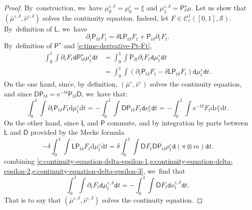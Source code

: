 \documentclass[JEP,XML,SOM,Unicode,published]{cedram}
\theoremstyle{definition}
\theoremstyle{remark}
\begin{document}
\begin{proof}
By~construction, we~have $\mu^{\varepsilon,\delta}_{0} = \mu^{\varepsilon}_{0} = \xi$ and $\mu^{\varepsilon,\delta}_{1} = \mathsf{P}^{\star}_{\delta} \mu$.
Let us show that $(\bar{\mu}^{\varepsilon,\delta}, \bar{\nu}^{\varepsilon,\delta})$ solves the continuity equation.
Indeed, let $F \in \mathscr{C}_{c}^{1}([0,1], \mathscr{S})$.
By~definition of $\mathsf{L}$, we~have
\begin{equation}\label{e:time-derivative-Pt-Ft}
\partial_{t} \mathsf{P}_{t \delta} F_{t} = \delta \mathsf{L} \mathsf{P}_{t \delta} F_{t} + \mathsf{P}_{t \delta} \partial_{t} F_{t}.
\end{equation}
By~definition of $\mathsf{P}^{\star}$ and \cref{e:time-derivative-Pt-Ft},
\begin{equation}\label{e:continuity-equation-delta-epsilon-1}
\begin{split}
\int_{0}^{1} \int \partial_{t} F_{t} \mathtt{d} \mathsf{P}^{\star}_{t\delta} \mu^{\varepsilon}_{t} \mathtt{d} t &= \int_{0}^{1} \int \mathsf{P}_{\delta t} \partial_{t} F_{t} \mathtt{d} \mu_{t}^{\varepsilon} \mathtt{d} t
\\&= \int_{0}^{1} \int (\partial_{t} \mathsf{P}_{t\delta}F_{t} - \delta \mathsf{L} \mathsf{P}_{t\delta}F_{t}) \mathtt{d} \mu^{\varepsilon}_{t} \mathtt{d} t.
\end{split}
\end{equation}
On the one hand, since, by definition, $(\bar{\mu}^{\varepsilon}, \bar{\nu}^{\varepsilon})$ solves the continuity equation, and since $\mathsf{D} \mathsf{P}_{t \delta} = \mathrm{e}^{-t \delta} \mathsf{P}_{t \delta} \mathsf{D}$, we~have that:
\begin{equation}\label{e:continuity-equation-delta-epsilon-2}
\int_{0}^{1} \int \partial_{t} \mathsf{P}_{t\delta}F_{t} \mathrm{d} \mu_{t}^{\varepsilon} \mathrm{d} t = - \int_{0}^{1} \int \mathsf{D} \mathsf{P}_{t \delta} F_{t} \mathtt{d} \nu^{\varepsilon}_{t} \mathtt{d} t = - \int_{0}^{1} \int \mathrm{e}^{-t\delta}F_{t} \mathrm{d} \nu^{\varepsilon}_{t} \mathrm{d} t.
\end{equation}
On the other hand, since $\mathsf{L}$ and $\mathsf{P}$ commute, and by integration by parts between $\mathsf{L}$ and $\mathsf{D}$ provided by the Mecke formula
\begin{equation}\label{e:continuity-equation-delta-epsilon-3}
- \delta \int_{0}^{1} \int \mathsf{L} \mathsf{P}_{t\delta} F_{t} \mathrm{d} \mu_{t}^{\varepsilon} \mathrm{d} t = \delta \int_{0}^{1} \int \mathsf{D} F_{t} \mathsf{D} \mathsf{P}_{t \delta} \rho^{\varepsilon}_{t} \mathtt{d} (\pi \otimes m) \mathtt{d} t.
\end{equation}
combining \cref{e:continuity-equation-delta-epsilon-1,e:continuity-equation-delta-epsilon-2,e:continuity-equation-delta-epsilon-3}, we~find that
\begin{equation*}
\int_{0}^{1} \int \partial_{t} F_{t} \mathtt{d} \mu^{\varepsilon,\delta}_{t} \mathtt{d} t = - \int_{0}^{1} \int \mathsf{D} F_{t} \mathtt{d} \nu^{\varepsilon, \delta}_{t} \mathtt{d} t.
\end{equation*}
That is to say that $(\bar{\mu}^{\varepsilon,\delta}, \bar{\nu}^{\varepsilon,\delta})$ solves the continuity equation.

\end{proof}
\end{document}
